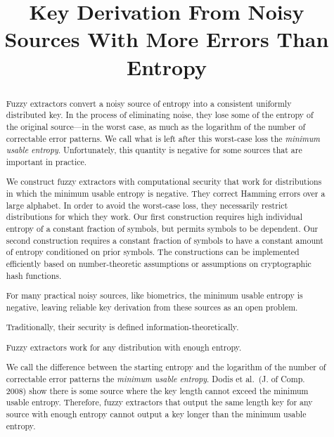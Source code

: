 \documentclass[11pt]{article}
\title{Key Derivation From Noisy Sources With More Errors Than Entropy}
\begin{document}
\maketitle


\begin{abstract}
Fuzzy extractors convert a noisy source of entropy into a consistent uniformly distributed key.  In the process of eliminating noise, they  lose some of the entropy of the original source---in the worst case, as much as the logarithm of the number of correctable error patterns. We call what is left after this worst-case loss the \emph{minimum usable entropy}.  Unfortunately, this quantity is negative for some sources that are important in practice.

We construct fuzzy extractors with computational security that work for distributions in which the minimum usable entropy is negative. They correct Hamming errors over a large alphabet. In order to avoid the worst-case loss, they necessarily restrict distributions for which they work.  Our first construction requires high individual entropy of a constant fraction of symbols, but permits symbols to be dependent.  Our second construction requires  a constant fraction of symbols to have a constant amount of entropy conditioned on prior symbols. The constructions can be implemented efficiently based on number-theoretic assumptions or assumptions on cryptographic hash functions.

\iffalse
For many practical noisy sources, like biometrics, the minimum usable entropy is negative, leaving reliable key derivation from these sources as an open problem.





Traditionally, their security is defined information-theoretically.  %

Fuzzy extractors work for any distribution with enough entropy.  %

We call the difference between the starting entropy and the logarithm of the number of correctable error patterns the \emph{minimum usable entropy}.  Dodis et al.~(J. of Comp. 2008) show there is some source where the key length cannot exceed the minimum usable entropy.  Therefore, fuzzy extractors that output the same length key for any source with enough entropy cannot output a key longer than the minimum usable entropy.


\end{abstract}
\end{document}
